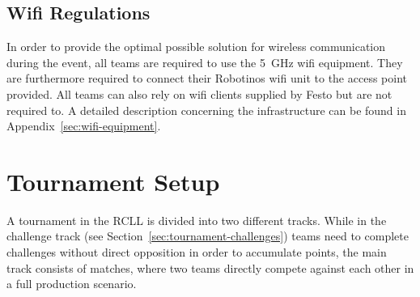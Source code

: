 \documentclass[12pt,twoside]{article}
\newenvironment{rulechange}{}{}
\newcommand{\refsec}[1]{Section~\ref{#1}}
\begin{document}

\subsection{Wifi Regulations}
\label{sec:wifi-regulations}
In order to provide the optimal possible solution for wireless
communication during the event, all teams are required to use the
\SI{5}{\giga\hertz} wifi equipment. They are furthermore required to
connect their Robotinos wifi unit to the access point provided. All
teams can also rely on wifi clients supplied by Festo but are not
required to. A detailed description concerning the infrastructure can
be found in Appendix~\ref{sec:wifi-equipment}.




\section{Tournament Setup}
A tournament in the \ac{RCLL} is divided into two different tracks.
While in the challenge track (see \refsec{sec:tournament-challenges}) teams
need to complete challenges without direct opposition in order to accumulate
points, the main track consists of matches, where two teams directly compete
against each other in a full production scenario.
\end{document}
